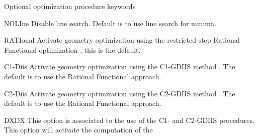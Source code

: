 Optional optimization procedure keywords
\begin{keywordlist}
\item[NOLIne]
Disable line search. Default is to use line search for minima.
\item[RATIonal]
Activate geometry optimization using the restricted step Rational Functional optimization \cite{rf,rs-rf},
this is the default.
\item[C1-Diis]
Activate geometry optimization using the C1-GDIIS method \cite{gdiis,diis1,diis2}.
The default is to use the Rational Functional approach.
\item[C2-Diis]
Activate geometry optimization using the C2-GDIIS method \cite{c2-diis}.
The default is to use the Rational Functional approach.
\item[DXDX]
This option is associated to the use of the C1- and C2-GDIIS
procedures. This option will activate the computation of the

\end{keywordlist}
